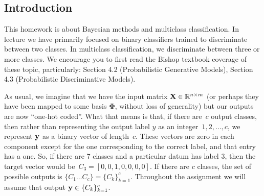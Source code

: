 \documentclass[submit]{harvardml}
\begin{document}

\subsection*{Introduction}

This homework is about Bayesian methods 
and  multiclass classification. In lecture we have
primarily focused on binary classifiers trained to discriminate
between two classes. In multiclass classification, we discriminate
between three or more classes. We encourage you to first read the
Bishop textbook coverage of these topic, particularly: Section 4.2
(Probabilistic Generative Models), Section 4.3 (Probabilistic
Discriminative Models).

As usual, we imagine that we have the input matrix $\mathbf{X} \in
\mathbb{R}^{n \times m}$ (or perhaps they have been mapped to some basis
$\bm{\Phi}$, without loss of generality) but our outputs are now
``one-hot coded''.  What that means is that, if there are~$c$ output
classes, then rather than representing the output label $y$ as an
integer~${1,2,\ldots,c}$, we represent $\mathbf{y}$ as a binary vector of
length~$c$. These vectors are zero in each
component except for the one corresponding to the correct label, and
that entry has a one.  So, if there are 7 classes and a particular
datum has label 3, then the target vector would be~${C_3 = [0,0,1,0,0,0,0]}$. 
If there are $c$ classes, the set of possible outputs is $\{C_1 \ldots C_c \} = \{C_k\}_{k=1}^c$.
Throughout the assignment we will assume
that output $\mathbf{y} \in \{C_k\}_{k=1}^c$.\\
\end{document}
